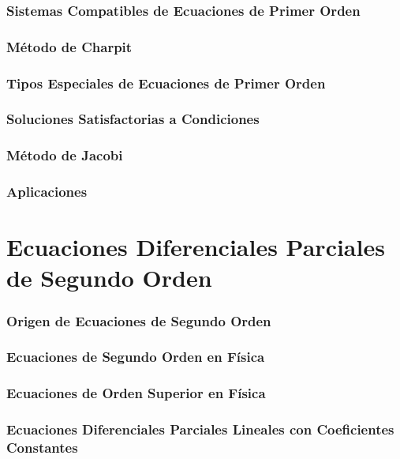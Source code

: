 \section{Sistemas Compatibles de Ecuaciones de Primer Orden}

\section{Método de Charpit}

\section{Tipos Especiales de Ecuaciones de Primer Orden}

\section{Soluciones Satisfactorias a Condiciones}

\section{Método de Jacobi}

\section{Aplicaciones}



\newpage
\part{Ecuaciones Diferenciales Parciales de Segundo Orden}


\section{Origen de Ecuaciones de Segundo Orden}

\section{Ecuaciones de Segundo Orden en Física}

\section{Ecuaciones de Orden Superior en Física}

\section{Ecuaciones Diferenciales Parciales Lineales con Coeficientes Constantes}

